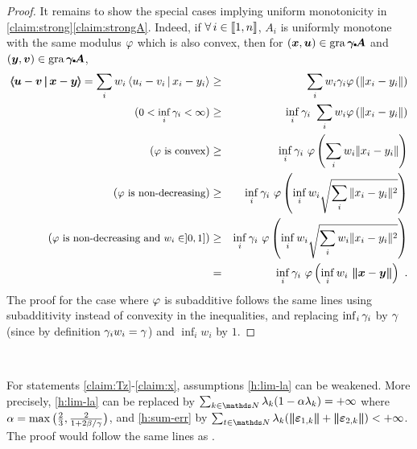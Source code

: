 \begin{proof}
It remains to show the special cases implying uniform monotonicity in \ref{claim:strong}\ref{claim:strongA}. Indeed, if $\forall \, i \in \llbracket1,n\rrbracket$, $A_i$ is uniformly monotone with the same modulus $\varphi$ which is also convex, then for $(\boldsymbol x,\boldsymbol u) \in \operatorname{gra} \boldsymbol{\gamma} {\scriptscriptstyle \! \bullet \!} \boldsymbol A$ and $(\boldsymbol y,\boldsymbol v) \in \operatorname{gra} \boldsymbol{\gamma} {\scriptscriptstyle \! \bullet \!} \boldsymbol A$,
\begin{eqnarray*}
\bdprod{\bu-\bv}{\bx-\by} =\sum_i w_i \dprod{u_i-v_i}{x_i-y_i} 
&\geq& \sum_i w_i \ga_i \phy\pa{\norm{x_i-y_i}} \\
(\text{\small $0 < \inf_i \ga_i < \infty$}) &\geq& \inf_i \ga_i ~ \sum_i w_i \phy\pa{\norm{x_i-y_i}} \\
(\text{\small $\phy$ is convex}) &\geq& \inf_i \ga_i ~ \phy\pa{\sum_i w_i \norm{x_i-y_i}} \\
(\text{\small $\phy$ is non-decreasing}) &\geq& \inf_i \ga_i ~ \phy\pa{\inf_i w_i \sqrt{\sum_i \norm{x_i-y_i}^2}} \\
(\text{\small $\phy$ is non-decreasing and $w_i \in ]0,1]$}) &\geq& \inf_i \ga_i ~ \phy\pa{\inf_i w_i \sqrt{\sum_i w_i \norm{x_i-y_i}^2}} \\
&=& \inf_i \ga_i ~ \phy\pa{\inf_i w_i ~ \bnorm{\bx-\by}} ~.
\end{eqnarray*}
The proof for the case where $\varphi$ is subadditive follows the same lines using subadditivity instead of convexity in the inequalities, and replacing $\inf_i \gamma_i$ by $\gamma$ (since by definition $\gamma_iw_i=\gamma$) and $\inf_i w_i$ by $1$.
\end{proof}
{~}\\

\begin{remark}
\label{rem:ext-la}
For statements \ref{claim:Tz}-\ref{claim:x}, assumptions \ref{h:lim-la} can be weakened. More precisely, \ref{h:lim-la} can be replaced by $\sum_{k \in \N} \la_k(1-\al\la_k) = \pinfty$ where $\alpha=\max\big( {\textstyle \frac{2}{3}},{\textstyle \frac{2}{1+2\beta/\gamma}} \big)$, and \ref{h:sum-err} by $\sum_{t\in\N} \lambda_k (\bnorm{\bEps_{1,k}} + \bnorm{\bEps_{2,k}}) < \pinfty$. The proof would follow the same lines as \cite[Lemma~5.1]{Combettes04}. 
\end{remark}


